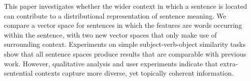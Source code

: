 This paper investigates whether the wider context in which a sentence is located can contribute to a distributional representation of sentence meaning. We compare a vector space for sentences in which the features are words occurring within the sentence, with two new vector spaces that only make use of surrounding context. Experiments on simple subject-verb-object similarity tasks show that all sentence spaces produce results that are comparable with previous work. However, qualitative analysis and user experiments indicate that extra-sentential contexts capture more diverse, yet topically coherent information.
